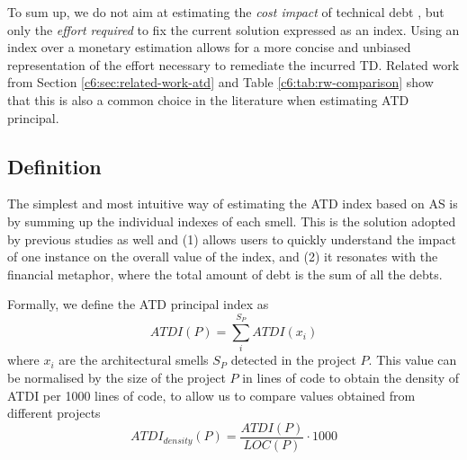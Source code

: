 To sum up, we do not aim at estimating the \emph{cost impact} of technical debt \cite{Avgeriou2016}, but only the \emph{effort required} to fix the current solution \cite{Avgeriou2016} expressed as an index. 
Using an index over a monetary estimation allows for a more concise and unbiased representation of the effort necessary to remediate the incurred TD. 
Related work from Section \ref{c6:sec:related-work-atd} and Table \ref{c6:tab:rw-comparison} show that this is also a common choice in the literature when estimating ATD principal.

\subsection{Definition}\label{c6:sec:approach-definition}
The simplest and most intuitive way of estimating the ATD index based on AS is by summing up the individual indexes of each smell\cite{Ampatzoglou2018}.
This is the solution adopted by previous studies as well \cite{Letouzey2010,Curtis2012,Marinescu2012,Roveda2018} and (1) allows users to quickly understand the impact of one instance on the overall value of the index, and (2) it resonates with the financial metaphor, where the total amount of debt is the sum of all the debts.

Formally, we define the ATD principal index as
\begin{equation}\label{c6:eq:atdi}
    ATDI(P) =  \sum_i^{S_P} ATDI(x_i)
\end{equation}
where $x_i$ are the architectural smells $S_P$ detected in the project $P$.
This value can be normalised by the size of the project $P$ in lines of code to obtain the density of ATDI per 1000 lines of code, to allow us to compare values obtained from different projects
\begin{equation}\label{c6:eq:atdi-normalised}
    ATDI_{density}(P) = \frac{ATDI(P)}{LOC(P)} \cdot 1000
\end{equation}


